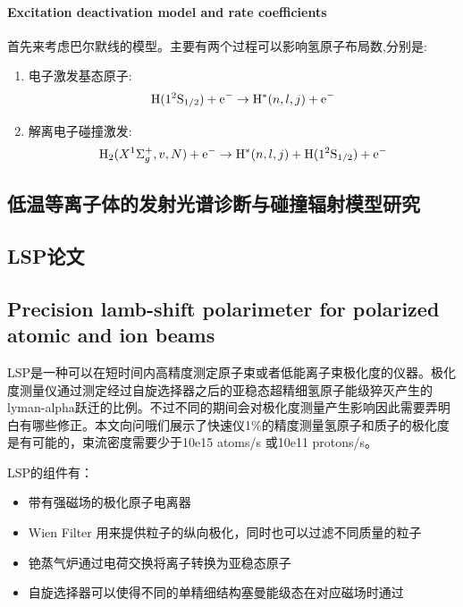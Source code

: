 \documentclass{article}
\numberwithin{equation}{subsection} %
\numberwithin{figure}{subsection} %
\numberwithin{table}{subsection} %
\begin{document}
\paragraph{Excitation deactivation model and rate coefficients} 首先来考虑巴尔默线的模型。主要有两个过程可以影响氢原子布局数,分别是:
\begin{enumerate}
    \item[i] 电子激发基态原子:
    \begin{equation}
        \ce{H}(1^{2}\ce{S1/2}) + \ce{e-} \rightarrow \ce{H}^*(n,l,j) + \ce{e-}
        \label{electron_excitation_hydrogen}
    \end{equation}
    \item[ii] 解离电子碰撞激发:
    \begin{equation}
        \ce{H2}(X^1\Sigma^+_g,v,N) + \ce{e-} \rightarrow \ce{H}^*(n,l,j) +   \ce{H}(1^{2}\ce{S1/2}) + \ce{e-}
        \label{dissociation_excitation_hydrogen}
    \end{equation}
\end{enumerate}








\subsection{低温等离子体的发射光谱诊断与碰撞辐射模型研究\cite{__2009}}



\subsection*{LSP论文}
\subsection{Precision lamb-shift polarimeter for polarized atomic and ion beams\cite{engels_precision_2003}}

LSP是一种可以在短时间内高精度测定原子束或者低能离子束极化度的仪器。极化度测量仪通过测定经过自旋选择器之后的亚稳态超精细氢原子能级猝灭产生的lyman-alpha跃迁的比例。不过不同的期间会对极化度测量产生影响因此需要弄明白有哪些修正。本文向问哦们展示了快速仪1\%的精度测量氢原子和质子的极化度是有可能的，束流密度需要少于10e15 atoms/s 或10e11 protons/s。

LSP的组件有：
\begin{itemize}
    \item 带有强磁场的极化原子电离器
    \item Wien Filter 用来提供粒子的纵向极化，同时也可以过滤不同质量的粒子 
    \item 铯蒸气炉通过电荷交换将离子转换为亚稳态原子
    \item 自旋选择器可以使得不同的单精细结构塞曼能级态在对应磁场时通过
\end{itemize}
\end{document}
